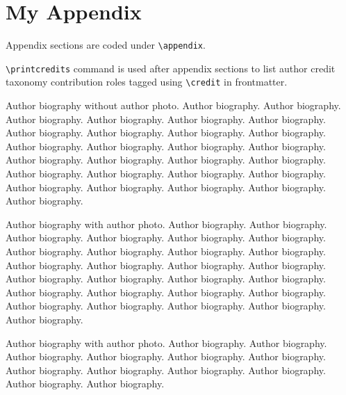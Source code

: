 \documentclass[a4paper,fleqn]{cas-dc}
\begin{document}
				\appendix
				\section{My Appendix}
				Appendix sections are coded under \verb+\appendix+.
				
				\verb+\printcredits+ command is used after appendix sections to list 
				author credit taxonomy contribution roles tagged using \verb+\credit+ 
				in frontmatter.
				
				\printcredits
				
				
				
				
				
				
				
				\bio{}
				Author biography without author photo.
				Author biography. Author biography. Author biography.
				Author biography. Author biography. Author biography.
				Author biography. Author biography. Author biography.
				Author biography. Author biography. Author biography.
				Author biography. Author biography. Author biography.
				Author biography. Author biography. Author biography.
				Author biography. Author biography. Author biography.
				Author biography. Author biography. Author biography.
				Author biography. Author biography. Author biography.
				\endbio
				
				\bio{}
				Author biography with author photo.
				Author biography. Author biography. Author biography.
				Author biography. Author biography. Author biography.
				Author biography. Author biography. Author biography.
				Author biography. Author biography. Author biography.
				Author biography. Author biography. Author biography.
				Author biography. Author biography. Author biography.
				Author biography. Author biography. Author biography.
				Author biography. Author biography. Author biography.
				Author biography. Author biography. Author biography.
				\endbio
				
				\bio{}
				Author biography with author photo.
				Author biography. Author biography. Author biography.
				Author biography. Author biography. Author biography.
				Author biography. Author biography. Author biography.
				Author biography. Author biography. Author biography.
				\endbio
				
			
\end{document}
